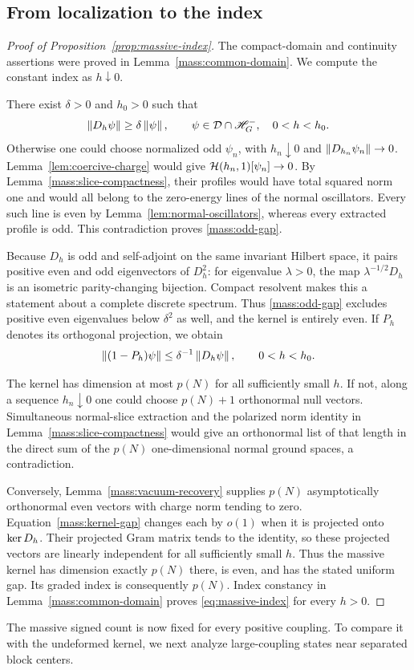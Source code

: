 \subsection{From localization to the index}

\begin{proof}[Proof of Proposition~\ref{prop:massive-index}]
The compact-domain and continuity assertions were proved in
Lemma~\ref{mass:common-domain}. We compute the constant index as
\(h\downarrow0\).

There exist \(\delta>0\) and \(h_0>0\) such that
\begin{equation}
\label{mass:odd-gap}
 \left\lVert D_h\psi\right\rVert\geq\delta\left\lVert \psi\right\rVert,
 \qquad \psi\in\mathcal D\cap\mathscr H_G^-,\quad 0<h<h_0.
\end{equation}
Otherwise one could choose normalized odd \(\psi_n\), with
\(h_n\downarrow0\) and \(\left\lVert D_{h_n}\psi_n\right\rVert\to0\).
Lemma~\ref{lem:coercive-charge} would give
\(\mathcal H(h_n,1)[\psi_n]\to0\). By
Lemma~\ref{mass:slice-compactness}, their profiles would have total
squared norm one and would all belong to the zero-energy lines of
the normal oscillators. Every such line is even by
Lemma~\ref{lem:normal-oscillators}, whereas every extracted profile
is odd. This contradiction proves \eqref{mass:odd-gap}.

Because \(D_h\) is odd and self-adjoint on the same invariant
Hilbert space, it pairs positive even and odd eigenvectors of
\(D_h^2\): for eigenvalue \(\lambda>0\), the map
\(\lambda^{-1/2}D_h\) is an isometric parity-changing bijection.
Compact resolvent makes this a statement about a complete discrete
spectrum. Thus \eqref{mass:odd-gap} excludes positive even
eigenvalues below \(\delta^2\) as well, and the kernel is entirely
even. If \(P_h\) denotes its orthogonal projection, we obtain
\begin{equation}
\label{mass:kernel-gap}
 \left\lVert (1-P_h)\psi\right\rVert\leq\delta^{-1}\left\lVert D_h\psi\right\rVert,
 \qquad 0<h<h_0.
\end{equation}

The kernel has dimension at most \(p(N)\) for all sufficiently
small \(h\). If not, along a sequence \(h_n\downarrow0\) one
could choose \(p(N)+1\) orthonormal null vectors. Simultaneous
normal-slice extraction and the polarized norm identity in
Lemma~\ref{mass:slice-compactness} would give an orthonormal list
of that length in the direct sum of the \(p(N)\) one-dimensional
normal ground spaces, a contradiction.

Conversely, Lemma~\ref{mass:vacuum-recovery} supplies \(p(N)\)
asymptotically orthonormal even vectors with charge norm tending
to zero. Equation~\eqref{mass:kernel-gap} changes each by \(o(1)\)
when it is projected onto \(\operatorname{ker} D_h\). Their projected Gram
matrix tends to the identity, so these projected vectors are
linearly independent for all sufficiently small \(h\). Thus the
massive kernel has dimension exactly \(p(N)\) there, is even,
and has the stated uniform gap. Its graded index is consequently
\(p(N)\). Index constancy in Lemma~\ref{mass:common-domain}
proves \eqref{eq:massive-index} for every \(h>0\).
\end{proof}

The massive signed count is now fixed for every positive coupling. To
compare it with the undeformed kernel, we next analyze large-coupling
states near separated block centers.
